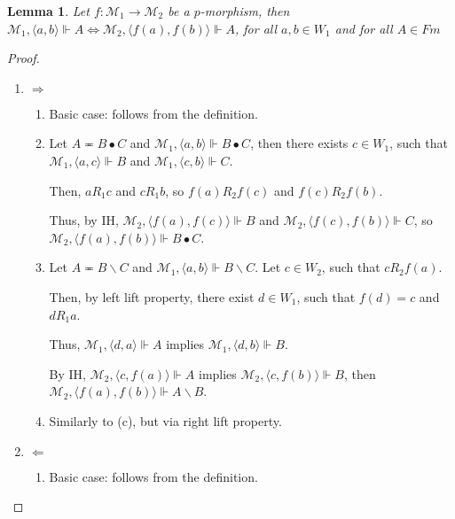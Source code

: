 \documentclass[a4paper]{article}
\theoremstyle{defin}
\theoremstyle{theorem}
\theoremstyle{prop}
\theoremstyle{lemma}
\newtheorem{lemma}{Lemma}
\theoremstyle{ex}
\theoremstyle{col}
\begin{document}
\begin{lemma}
  Let $f : \mathcal{M}_1 \to \mathcal{M}_2$ be a $p$-morphism, then
  $\mathcal{M}_1, \langle a, b \rangle \Vdash A \Leftrightarrow \mathcal{M}_2, \langle f(a), f(b) \rangle \Vdash A$,
  for all $a, b \in W_1$ and for all $A \in Fm$
\end{lemma}

\begin{proof}
$ $

  \begin{enumerate}
    \item $\Rightarrow$
      \begin{enumerate}
        \item Basic case: follows from the definition.
        \item Let $A \eqcirc B \bullet C$ and $\mathcal{M}_1, \langle a, b \rangle \Vdash B \bullet C$, then
        there exists $c \in W_1$, such that $\mathcal{M}_1, \langle a, c \rangle \Vdash B$ and
        $\mathcal{M}_1, \langle c, b \rangle \Vdash C$.

        Then, $a R_1 c$ and $c R_1 b$, so $f(a) R_2 f(c)$ and $f(c) R_2 f(b)$.

        Thus, by IH, $\mathcal{M}_2, \langle f(a), f(c) \rangle \Vdash B$ and
        $\mathcal{M}_2, \langle f(c), f(b) \rangle \Vdash C$, so $\mathcal{M}_2, \langle f(a), f(b) \rangle \Vdash B \bullet C$.
        \item Let $A \eqcirc B \backslash C$ and $\mathcal{M}_1, \langle a, b \rangle \Vdash B \backslash C$.
        Let $c \in W_2$, such that $c R_2 f(a)$.

        Then, by left lift property, there exist $d \in W_1$, such that $f(d) = c$ and $d R_1 a$.

        Thus, $\mathcal{M}_1, \langle d, a \rangle \Vdash A$ implies
        $\mathcal{M}_1, \langle d, b \rangle \Vdash B$.

        By IH, $\mathcal{M}_2, \langle c, f(a) \rangle \Vdash A$ implies
        $\mathcal{M}_2, \langle c, f(b) \rangle \Vdash B$, then $\mathcal{M}_2, \langle f(a), f(b) \rangle \Vdash A \backslash B$.

        \item Similarly to (c), but via right lift property.
      \end{enumerate}
    \item $\Leftarrow$
    \begin{enumerate}
      \item Basic case: follows from the definition.


\end{enumerate}
\end{enumerate}
\end{proof}
\end{document}
